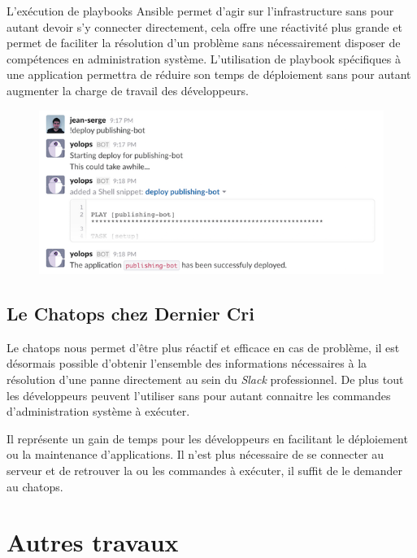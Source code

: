 \documentclass[12pt,a4paper]{article}
\begin{document}
  \bigskip

  L'exécution de playbooks Ansible permet d'agir sur l'infrastructure sans
  pour autant devoir s'y connecter directement, cela offre une réactivité
  plus grande et permet de faciliter la résolution d'un problème sans
  nécessairement disposer de compétences en administration système.
  L'utilisation de playbook spécifiques à une application permettra de
  réduire son temps de déploiement sans pour autant augmenter la charge de
  travail des développeurs.

  \begin{figure}[htbp]
  \centering
  \includegraphics{deploy.png}
  \caption{}
  \end{figure}

  \newpage

  \subsection{Le Chatops chez Dernier
  Cri}\label{le-chatops-chez-dernier-cri}

  \bigskip

  Le chatops nous permet d'être plus réactif et efficace en cas de
  problème, il est désormais possible d'obtenir l'ensemble des
  informations nécessaires à la résolution d'une panne directement au sein
  du \emph{Slack} professionnel. De plus tout les développeurs peuvent
  l'utiliser sans pour autant connaitre les commandes d'administration
  système à exécuter.

  \bigskip

  Il représente un gain de temps pour les développeurs en facilitant le
  déploiement ou la maintenance d'applications. Il n'est plus nécessaire
  de se connecter au serveur et de retrouver la ou les commandes à
  exécuter, il suffit de le demander au chatops.

  \newpage

  \section{Autres travaux}\label{autres-travaux}
\end{document}

